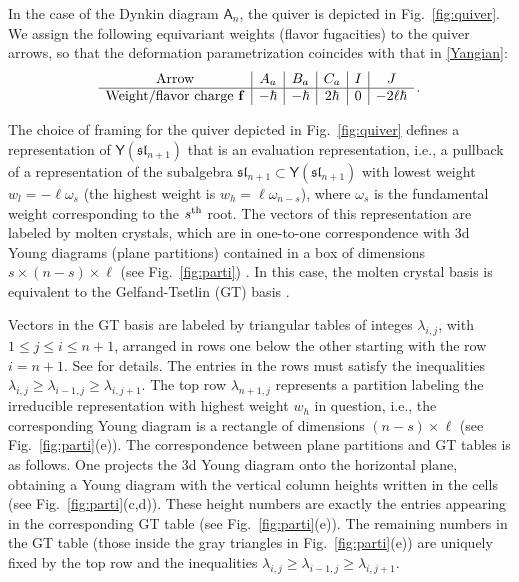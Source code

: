 \documentclass[10pt]{article}
\theoremstyle{definition}
\def\fl{\mathfrak{l}}
\def\fs{\mathfrak{s}}
\def\fs{\mathfrak{s}}
\def\myA{{\mathsf{A}}}
\def\myY{{\mathsf{Y}}}
\numberwithin{equation}{section}
\begin{document}
In the case of the Dynkin diagram $\myA_n$, the quiver is depicted in Fig.~\ref{fig:quiver}.
We assign the following equivariant weights (flavor fugacities) to the quiver arrows, so that the deformation parametrization coincides with that in \eqref{Yangian}:
\begin{equation}\label{fcharges}
	\begin{array}{c|c|c|c|c|c}
		\mbox{Arrow} & A_a & B_a & C_a & I & J\\
		\hline
		\mbox{Weight/flavor charge }{\bf f} & -\hbar & -\hbar & 2\hbar & 0 & -2\ell \hbar
	\end{array}\,.
\end{equation}

The choice of framing for the quiver depicted in Fig.~\ref{fig:quiver} defines a representation of $\myY(\fs\fl_{n+1})$ that is an evaluation representation, i.e., a pullback of a representation of the subalgebra $\fs\fl_{n+1}\subset\myY(\fs\fl_{n+1})$ with lowest weight $w_l=-\ell\omega_s$ (the highest weight is $w_h=\ell\omega_{n-s}$), where $\omega_s$ is the fundamental weight corresponding to the $s^{\rm th}$ root.
The vectors of this representation are labeled by molten crystals, which are in one-to-one correspondence with 3d Young diagrams (plane partitions) contained in a box of dimensions $s\times (n-s)\times \ell$ (see Fig.~\ref{fig:parti}) \cite{Galakhov:2024bzs,Gavshin:2025akn,Galakhov:2026cwv}.
In this case, the molten crystal basis is equivalent to the Gelfand-Tsetlin (GT) basis \cite{Gavshin:2025akn}.

Vectors in the GT basis are labeled by triangular tables of integes $\lambda_{i,j}$, with $1\leq j \leq i \leq n+1$, arranged in rows one below the other starting with the row $i=n+1$.
See \cite{molev2006gelfand} for details.
The entries in the rows must satisfy the inequalities $\lambda_{i,j}\geq \lambda_{i-1,j}\geq \lambda_{i,j+1}$.
The top row $\lambda_{n+1,j}$ represents a partition labeling the irreducible representation with highest weight $w_h$ in question, i.e., the corresponding Young diagram is a rectangle of dimensions $(n-s)\times \ell$ (see Fig.~\ref{fig:parti}(e)).
The correspondence between plane partitions and GT tables is as follows.
One projects the 3d Young diagram onto the horizontal plane, obtaining a Young diagram with the vertical column heights written in the cells (see Fig.~\ref{fig:parti}(c,d)).
These height numbers are exactly the entries appearing in the corresponding GT table (see Fig.~\ref{fig:parti}(e)).
The remaining numbers in the GT table (those inside the gray triangles in Fig.~\ref{fig:parti}(e)) are uniquely fixed by the top row and the inequalities $\lambda_{i,j}\geq \lambda_{i-1,j}\geq \lambda_{i,j+1}$.
\end{document}
